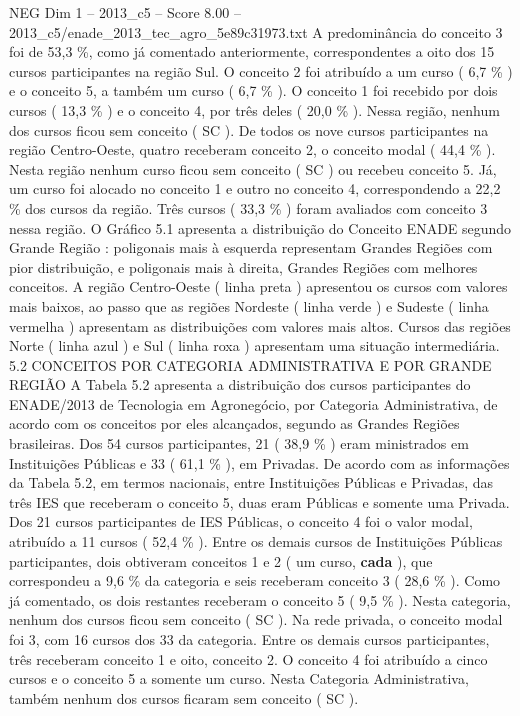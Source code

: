 \begin{textsample}{NEG Dim 1 – 2013\_c5 – Score 8.00 – 2013\_c5/enade\_2013\_tec\_agro\_5e89c31973.txt}
A predominância do conceito 3 foi de 53,3 \%, como já comentado anteriormente, correspondentes a oito dos 15 cursos participantes na região Sul.
O conceito 2 foi atribuído a um curso ( 6,7 \% ) e o conceito 5, a também um curso ( 6,7 \% ).
O conceito 1 foi recebido por dois cursos ( 13,3 \% ) e o conceito 4, por três deles ( 20,0 \% ).
Nessa região, nenhum dos cursos ficou sem conceito ( SC ).
De todos os nove cursos participantes na região Centro-Oeste, quatro receberam conceito 2, o conceito modal ( 44,4 \% ).
Nesta região nenhum curso ficou sem conceito ( SC ) ou recebeu conceito 5.
Já, um curso foi alocado no conceito 1 e outro no conceito 4, correspondendo a 22,2 \% dos cursos da região.
Três cursos ( 33,3 \% ) foram avaliados com conceito 3 nessa região.
O Gráfico 5.1 apresenta a distribuição do Conceito ENADE segundo Grande Região : poligonais mais à esquerda representam Grandes Regiões com pior distribuição, e poligonais mais à direita, Grandes Regiões com melhores conceitos.
A região Centro-Oeste ( linha preta ) apresentou os cursos com valores mais baixos, ao passo que as regiões Nordeste ( linha verde ) e Sudeste ( linha vermelha ) apresentam as distribuições com valores mais altos.
Cursos das regiões Norte ( linha azul ) e Sul ( linha roxa ) apresentam uma situação intermediária. 5.2 CONCEITOS POR CATEGORIA ADMINISTRATIVA E POR GRANDE REGIÃO A Tabela 5.2 apresenta a distribuição dos cursos participantes do ENADE/2013 de Tecnologia em Agronegócio, por Categoria Administrativa, de acordo com os conceitos por eles alcançados, segundo as Grandes Regiões brasileiras.
Dos 54 cursos participantes, 21 ( 38,9 \% ) eram ministrados em Instituições Públicas e 33 ( 61,1 \% ), em Privadas.
De acordo com as informações da Tabela 5.2, em termos nacionais, entre Instituições Públicas e Privadas, das três IES que receberam o conceito 5, duas eram Públicas e somente uma Privada.
Dos 21 cursos participantes de IES Públicas, o conceito 4 foi o valor modal, atribuído a 11 cursos ( 52,4 \% ).
Entre os demais cursos de Instituições Públicas participantes, dois obtiveram conceitos 1 e 2 ( um curso, \textbf{cada} ), que correspondeu a 9,6 \% da categoria e seis receberam conceito 3 ( 28,6 \% ).
Como já comentado, os dois restantes receberam o conceito 5 ( 9,5 \% ).
Nesta categoria, nenhum dos cursos ficou sem conceito ( SC ).
Na rede privada, o conceito modal foi 3, com 16 cursos dos 33 da categoria.
Entre os demais cursos participantes, três receberam conceito 1 e oito, conceito 2.
O conceito 4 foi atribuído a cinco cursos e o conceito 5 a somente um curso.
Nesta Categoria Administrativa, também nenhum dos cursos ficaram sem conceito ( SC ).

\end{textsample}

